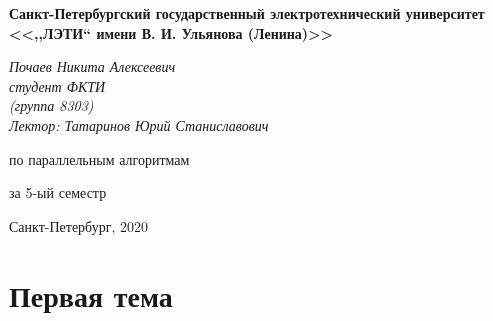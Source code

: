 


\thispagestyle{empty}
\begin{center}
	\textbf{Санкт-Петербургский государственный электротехнический университет \\ <<,,\hspace{0.5pt}ЛЭТИ\hspace{0.5pt}`` имени В. И. Ульянова (Ленина)>>}
\end{center}
\vspace{13ex}
\begin{flushright} %
	\noindent %
	\textit{Почаев Никита Алексеевич}
	\\
	\textit{студент ФКТИ \\(группа 8303)}
	\\
	\textit{Лектор: Татаринов Юрий Станиславович}
	\\
	
\end{flushright}
\begin{center}
	\vspace{13ex}
	\vspace{1ex}
	
	по параллельным алгоритмам
	
	
	за 5-ый семестр
	
	
	\vfill %
	{\small Санкт-Петербург, 2020}
\end{center}

\newpage

\section{Первая тема}



\newpage

\tableofcontents


